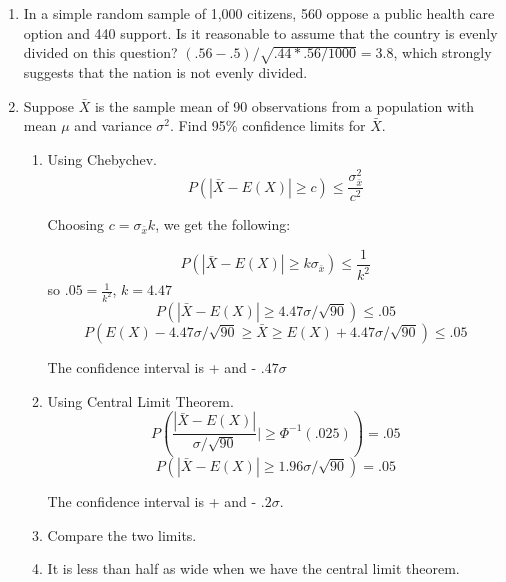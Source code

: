 \documentclass[11pt,letterpaper]{article}
\numberwithin{equation}{section}
\begin{document}
\begin{enumerate}[I]
\begin{enumerate}
\begin{enumerate}
\end{enumerate}
\item  In a simple random sample of 1,000 citizens, 560 oppose a public health care option and 440 support. Is it reasonable to assume that the country is evenly divided on this question? $(.56-.5)/\sqrt{.44*.56/1000}=3.8$, which strongly suggests that the nation is not evenly divided.

\item Suppose $\bar{X}$ is the sample mean of 90 observations from a population with mean $\mu$ and variance $\sigma^2$.  Find 95\% confidence limits for $\bar{X}$.
\begin{enumerate}
\item[a)] Using Chebychev.  
$$P(|\bar{X}-E(X)|\geq c )\leq \frac{\sigma^2_{\bar{x}}}{c^2}$$

Choosing $c=\sigma_{\bar{x}}k$, we get the following:

$$P(|\bar{X}-E(X)|\geq k\sigma_{\bar{x}} )\leq \frac{1}{k^2}$$
so $.05=\frac{1}{k^2}$, $k=4.47$
$$P(|\bar{X}-E(X)|\geq 4.47\sigma/\sqrt{90} )\leq .05$$
$$P(E(X)-4.47\sigma/\sqrt{90} \geq \bar{X}\geq E(X)+4.47\sigma/\sqrt{90})\leq .05$$

The confidence interval is + and - $.47\sigma$

\item[b)] Using Central Limit Theorem.
$$P(\frac{|\bar{X}-E(X)|}{\sigma/\sqrt{90}}|\geq \Phi^{-1}(.025))=.05$$
$$P(|\bar{X}-E(X)|\geq 1.96\sigma/\sqrt{90})=.05$$

The confidence interval is + and - $.2\sigma$.

\item[c)] Compare the two limits.  
\item[A)] It is less than half as wide when we have the central limit theorem.

\end{enumerate}

\end{enumerate}
\end{enumerate}
\end{document}
